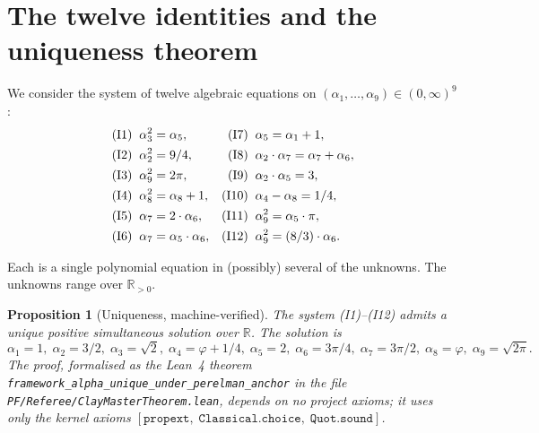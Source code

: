 \documentclass[11pt,a4paper]{amsart}
\theoremstyle{plain}
\newtheorem{proposition}[theorem]{Proposition}
\theoremstyle{definition}
\begin{document}
\section{The twelve identities and the uniqueness theorem}\label{sec:invariants}

We consider the system of twelve algebraic equations on $(\alpha_1, \ldots, \alpha_9) \in (0, \infty)^9$:
\begin{align*}
\textup{(I1)}\;\;& \alpha_3^2 = \alpha_5, &
\textup{(I7)}\;\;& \alpha_5 = \alpha_1 + 1,\\
\textup{(I2)}\;\;& \alpha_2^2 = 9/4, &
\textup{(I8)}\;\;& \alpha_2\cdot\alpha_7 = \alpha_7 + \alpha_6,\\
\textup{(I3)}\;\;& \alpha_9^2 = 2\pi, &
\textup{(I9)}\;\;& \alpha_2\cdot\alpha_5 = 3,\\
\textup{(I4)}\;\;& \alpha_8^2 = \alpha_8 + 1, &
\textup{(I10)}\;\;& \alpha_4 - \alpha_8 = 1/4,\\
\textup{(I5)}\;\;& \alpha_7 = 2\cdot\alpha_6, &
\textup{(I11)}\;\;& \alpha_9^2 = \alpha_5\cdot\pi,\\
\textup{(I6)}\;\;& \alpha_7 = \alpha_5\cdot\alpha_6, &
\textup{(I12)}\;\;& \alpha_9^2 = (8/3)\cdot\alpha_6.
\end{align*}

Each is a single polynomial equation in (possibly) several of the unknowns. The unknowns range over $\mathbb{R}_{>0}$.

\begin{proposition}[Uniqueness, machine-verified]\label{prop:unique}
The system \textup{(I1)--(I12)} admits a unique positive simultaneous solution over $\mathbb{R}$. The solution is
\[
\alpha_1 = 1,\;\alpha_2 = 3/2,\;\alpha_3 = \sqrt{2},\;\alpha_4 = \varphi + 1/4,\;\alpha_5 = 2,\;
\alpha_6 = 3\pi/4,\;\alpha_7 = 3\pi/2,\;\alpha_8 = \varphi,\;\alpha_9 = \sqrt{2\pi}.
\]
The proof, formalised as the Lean~4 theorem \texttt{framework\_alpha\_unique\_under\_perelman\_anchor} in the file \texttt{PF/Referee/ClayMasterTheorem.lean}, depends on no project axioms; it uses only the kernel axioms $[\texttt{propext},\;\texttt{Classical.choice},\;\texttt{Quot.sound}]$.
\end{proposition}
\end{document}
